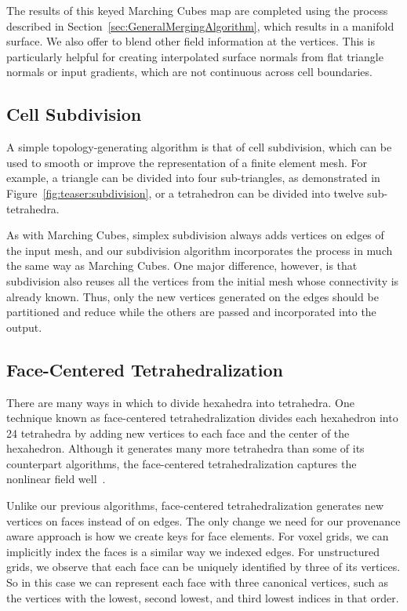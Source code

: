 \documentclass[10pt,journal,cspaper,compsoc]{IEEEtran}
\begin{document}
The results of this keyed Marching Cubes map are completed using the
 process described in
Section~\ref{sec:GeneralMergingAlgorithm}, which results in a manifold
surface.  We also offer to blend other field information at the vertices.
This is particularly helpful for creating interpolated surface normals from
flat triangle normals or input gradients, which are not continuous across
cell boundaries.

\subsection{Cell Subdivision}

A simple topology-generating algorithm is that of cell subdivision, which
can be used to smooth or improve the representation of a finite element
mesh.  For example, a triangle can be divided into four sub-triangles, as
demonstrated in Figure~\ref{fig:teaser:subdivision}, or a tetrahedron can
be divided into twelve sub-tetrahedra.

As with Marching Cubes, simplex subdivision always adds vertices on edges
of the input mesh, and our subdivision algorithm incorporates the
 process in much the same way as Marching Cubes.  One major
difference, however, is that subdivision also reuses all the vertices from
the initial mesh whose connectivity is already known.  Thus, only the new
vertices generated on the edges should be partitioned and reduce while the
others are passed and incorporated into the output.

\subsection{Face-Centered Tetrahedralization}

There are many ways in which to divide hexahedra into tetrahedra.  One
technique known as face-centered tetrahedralization divides each hexahedron
into 24 tetrahedra by adding new vertices to each face and the center of
the hexahedron.  Although it generates many more tetrahedra than some of
its counterpart algorithms, the face-centered tetrahedralization captures
the nonlinear field well~\cite{Carr2006}.

Unlike our previous algorithms, face-centered tetrahedralization generates
new vertices on faces instead of on edges.  The only change we need for our
provenance aware approach is how we create keys for face elements.  For
voxel grids, we can implicitly index the faces is a similar way we indexed
edges.  For unstructured grids, we observe that each face can be uniquely
identified by three of its vertices.  So in this case we can represent each
face with three canonical vertices, such as the vertices with the lowest,
second lowest, and third lowest indices in that order.
\end{document}

